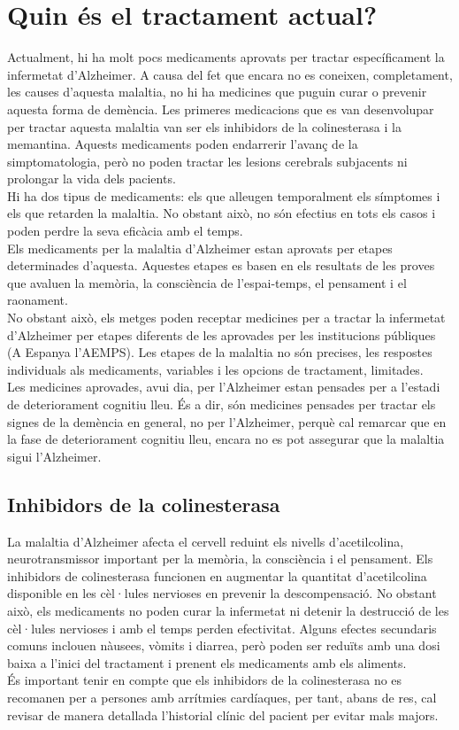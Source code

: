 \documentclass[a4paper,12pt]{report}
\begin{document}
\section*{Quin és el tractament actual?}
Actualment, hi ha molt pocs medicaments aprovats per tractar específicament la infermetat d'Alzheimer. A causa del fet que encara no es coneixen, completament, les causes d'aquesta malaltia, no hi ha medicines que puguin curar o prevenir aquesta forma de demència. Les primeres medicacions que es van desenvolupar per tractar aquesta malaltia van ser els inhibidors de la colinesterasa i la memantina. Aquests medicaments poden endarrerir l'avanç de la simptomatologia, però no poden tractar les lesions cerebrals subjacents ni prolongar la vida dels pacients.\\
Hi ha dos tipus de medicaments: els que alleugen temporalment els símptomes i els que retarden la malaltia. No obstant això, no són efectius en tots els casos i poden perdre la seva eficàcia amb el temps.\\
Els medicaments per la malaltia d'Alzheimer estan aprovats per etapes determinades d'aquesta. Aquestes etapes es basen en els resultats de les proves que avaluen la memòria, la consciència de l'espai-temps, el pensament i el raonament.\\
No obstant això, els metges poden receptar medicines per a tractar la infermetat d'Alzheimer per etapes diferents de les aprovades per les institucions públiques (A Espanya l'AEMPS). Les etapes de la malaltia no són precises, les respostes individuals als medicaments, variables i les opcions de tractament, limitades.\\
Les medicines aprovades, avui dia, per l'Alzheimer estan pensades per a l'estadi de deteriorament cognitiu lleu. És a dir, són medicines pensades per tractar els signes de la demència en general, no per l'Alzheimer, perquè cal remarcar que en la fase de deteriorament cognitiu lleu, encara no es pot assegurar que la malaltia sigui l'Alzheimer.
\subsection*{Inhibidors de la colinesterasa}
La malaltia d'Alzheimer afecta el cervell reduint els nivells d'acetilcolina, neurotransmissor important per la memòria, la consciència i el pensament. Els inhibidors de colinesterasa funcionen en augmentar la quantitat d'acetilcolina disponible en les cèl·lules nervioses en prevenir la descompensació. No obstant això, els medicaments no poden curar la infermetat ni detenir la destrucció de les cèl·lules nervioses i amb el temps perden efectivitat. Alguns efectes secundaris comuns inclouen nàusees, vòmits i diarrea, però poden ser reduïts amb una dosi baixa a l'inici del tractament i prenent els medicaments amb els aliments.\\
És important tenir en compte que els inhibidors de la colinesterasa no es recomanen per a persones amb arrítmies cardíaques, per tant, abans de res, cal revisar de manera detallada l'historial clínic del pacient per evitar mals majors.
\end{document}
